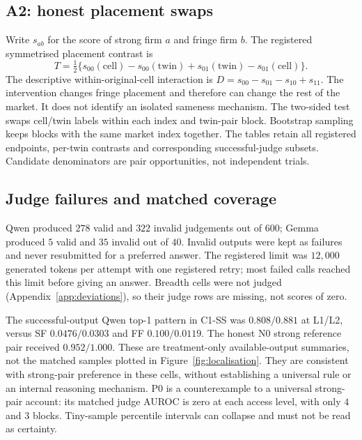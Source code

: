 \subsection{A2: honest placement swaps}
Write $s_{ab}$ for the score of strong firm $a$ and fringe firm $b$.
The registered symmetrised placement contrast is
\[
T=\tfrac12\{s_{00}(\mathrm{cell})-s_{00}(\mathrm{twin})
+s_{01}(\mathrm{twin})-s_{01}(\mathrm{cell})\}.
\]
The descriptive within-original-cell interaction is
$D=s_{00}-s_{01}-s_{10}+s_{11}$. The intervention changes fringe placement
and therefore can change the rest of the market. It does not identify
an isolated sameness mechanism. The two-sided test swaps cell/twin labels
within each index and twin-pair block. Bootstrap sampling keeps blocks with
the same market index together. The tables retain all registered endpoints,
per-twin contrasts and corresponding successful-judge subsets.
Candidate denominators are pair opportunities, not independent trials.


\subsection{Judge failures and matched coverage}
Qwen produced $278$ valid and $322$ invalid judgements out of $600$;
Gemma produced $5$ valid and $35$ invalid out of $40$.
Invalid outputs were kept as failures and never resubmitted for a
preferred answer. The registered limit was $12{,}000$ generated tokens per
attempt with one registered retry; most failed calls reached this limit
before giving an answer. Breadth cells were not judged
(Appendix~\ref{app:deviations}), so their judge rows are missing, not
scores of zero.

The successful-output Qwen top-1 pattern in C1-SS was $0.808/0.881$ at
L1/L2, versus SF $0.0476/0.0303$ and FF $0.100/0.0119$.
The honest N0 strong reference pair received $0.952/1.000$.
These are treatment-only available-output summaries, not the matched
samples plotted in Figure~\ref{fig:localisation}. They are consistent with
strong-pair preference in these cells, without establishing a universal
rule or an internal reasoning mechanism. P0 is a counterexample to a
universal strong-pair account: its matched judge AUROC is zero at each
access level, with only $4$ and $3$ blocks. Tiny-sample percentile intervals
can collapse and must not be read as certainty.


